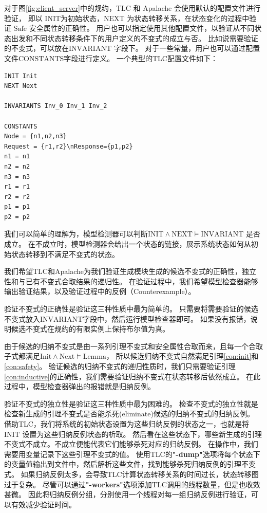 对于图\ref{fig:client_server}中的规约，TLC 和 Apalache 会使用默认的配置文件进行验证，
即以 $\text{INIT}$为初始状态，$\text{NEXT}$ 为状态转移关系，在状态变化的过程中验证 $\text{Safe}$ 安全属性的正确性。
用户也可以指定使用其他配置文件，以验证从不同状态出发和不同状态转移条件下的用户定义的不变式的成立与否。
比如说需要验证的不变式，可以放在$\text{INVARIANT}$ 字段下。
对于一些常量，用户也可以通过配置文件$\text{CONSTANTS}$字段进行定义。
一个典型的TLC配置文件如下：
\begin{lstlisting}[caption={TLC 配置文件}]
INIT Init
NEXT Next

INVARIANTS Inv_0 Inv_1 Inv_2

CONSTANTS
Node = {n1,n2,n3}
Request = {r1,r2}\nResponse={p1,p2}
n1 = n1
n2 = n2
n3 = n3
r1 = r1
r2 = r2
p1 = p1
p2 = p2
\end{lstlisting}
我们可以简单的理解为，模型检测器可以判断$\text{INIT} \wedge \text{NEXT} \vDash \text{INVARIANT}$ 是否成立。
在不成立时，模型检测器会给出一个状态的链接，展示系统状态如何从初始状态转移到不满足不变式的状态。

我们希望TLC和Apalache为我们验证生成模块生成的候选不变式的正确性，独立性和与已有不变式合取结果的递归性。
在验证过程中，我们希望模型检查器能够输出验证结果，以及验证过程中的反例（Counterexample）。

验证不变式的正确性是验证这三种性质中最为简单的。
只需要将需要验证的候选不变式放入$\text{INVARIANT}$字段中，然后运行模型检查器即可。
如果没有报错，说明候选不变式在规约的有限实例上保持布尔值为真。

由于候选的归纳不变式是由一系列引理不变式和安全属性合取而来，且每一个合取子式都满足$\text{Init} \wedge \text{Next} \vDash \text{Lemma}$，
所以候选归纳不变式自然满足引理\ref{con:init}和\ref{con:safety}。
验证候选的归纳不变式的递归性质时，我们只需要验证引理\ref{con:inductive}的正确性，我们需要验证归纳不变式在状态转移后依然成立。
在此过程中，模型检查器弹出的报错就是归纳反例。

验证不变式的独立性是验证这三种性质中最为困难的。
检查不变式的独立性就是检查新生成的引理不变式是否能杀死(eliminate)候选的归纳不变式的归纳反例。
借助TLC，我们将系统的初始状态设置为这些归纳反例的状态之一，也就是将$\text{INIT}$ 设置为这些归纳反例状态的析取。
然后看在这些状态下，哪些新生成的引理不变式不成立。不成立便能代表它们能够杀死对应的归纳反例。
在操作中，我们需要用变量记录下这些引理不变式的值。
使用TLC的\textbf{"-dump"}选项将每个状态下的变量值输出到文件中，然后解析这些文件，找到能够杀死归纳反例的引理不变式。
如果归纳反例太多，会导致TLC计算状态转移关系的时间过长，状态转移图过于复杂。
尽管可以通过\textbf{"-workers"}选项添加TLC调用的线程数量，但是也收效甚微。
因此将归纳反例分组，分别使用一个线程对每一组归纳反例进行验证，可以有效减少验证时间。

